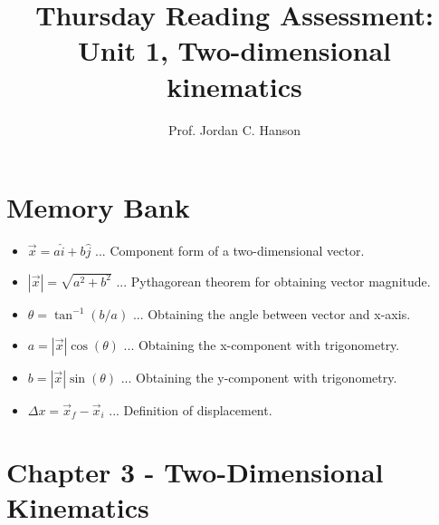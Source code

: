 \documentclass{article}
\begin{document}
\title{Thursday Reading Assessment: Unit 1, Two-dimensional kinematics}
\author{Prof. Jordan C. Hanson}

\maketitle

\section{Memory Bank}

\begin{itemize}
\item $\vec{x} = a \hat{i} + b\hat{j}$ ... Component form of a two-dimensional vector.
\item $|\vec{x}| = \sqrt{a^2+b^2}$ ... Pythagorean theorem for obtaining vector magnitude.
\item $\theta = \tan^{-1}(b/a)$ ... Obtaining the angle between vector and x-axis.
\item $a = |\vec{x}|\cos(\theta)$ ... Obtaining the x-component with trigonometry.
\item $b = |\vec{x}|\sin(\theta)$ ... Obtaining the y-component with trigonometry.
\item $\Delta x = \vec{x}_f - \vec{x}_i$ ... Definition of displacement.
\end{itemize}

\section{Chapter 3 - Two-Dimensional Kinematics}
\end{document}
